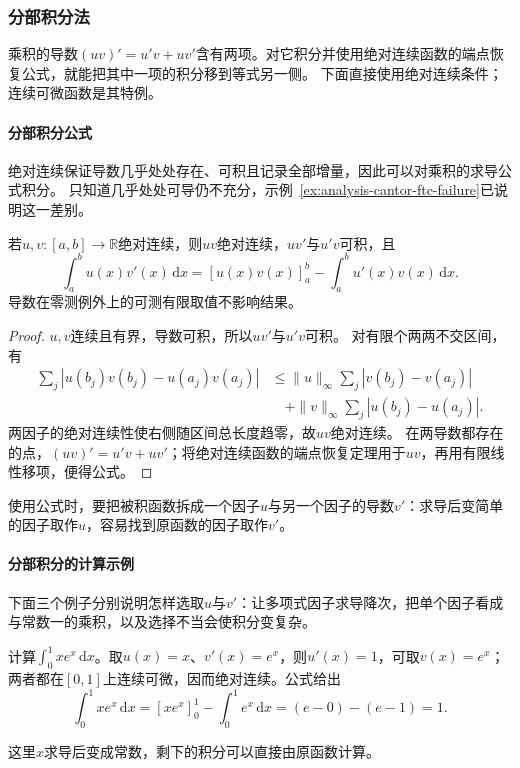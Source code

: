 \subsubsection{分部积分法}
\label{sec:analysis-integration-remainders}

乘积的导数$(uv)'=u'v+uv'$含有两项。对它积分并使用绝对连续函数的端点恢复公式，就能把其中一项的积分移到等式另一侧。
下面直接使用绝对连续条件；连续可微函数是其特例。

\paragraph{分部积分公式}
绝对连续保证导数几乎处处存在、可积且记录全部增量，因此可以对乘积的求导公式积分。
只知道几乎处处可导仍不充分，示例~\ref{ex:analysis-cantor-ftc-failure}已说明这一差别。
\begin{theorem}[勒贝格积分的分部积分公式]
\label{thm:analysis-lebesgue-integration-by-parts}
若$u,v:[a,b]\to\mathbb R$绝对连续，则$uv$绝对连续，$uv'$与$u'v$可积，且
\begin{equation}
 \int_a^bu(x)v'(x)\,\mathrm dx
 =[u(x)v(x)]_a^b-\int_a^bu'(x)v(x)\,\mathrm dx.
\label{eq:analysis-integration-by-parts}
\end{equation}
导数在零测例外上的可测有限取值不影响结果。
\end{theorem}
\begin{proof}
$u,v$连续且有界，导数可积，所以$uv'$与$u'v$可积。
对有限个两两不交区间，有
\[
 \begin{aligned}
 \sum_j|u(b_j)v(b_j)-u(a_j)v(a_j)|
 &\leq\|u\|_\infty\sum_j|v(b_j)-v(a_j)|\\
 &\quad+\|v\|_\infty\sum_j|u(b_j)-u(a_j)|.
 \end{aligned}
\]
两因子的绝对连续性使右侧随区间总长度趋零，故$uv$绝对连续。
在两导数都存在的点，$(uv)'=u'v+uv'$；将绝对连续函数的端点恢复定理用于$uv$，再用有限线性移项，便得公式。
\end{proof}
使用公式时，要把被积函数拆成一个因子$u$与另一个因子的导数$v'$：求导后变简单的因子取作$u$，容易找到原函数的因子取作$v'$。

\paragraph{分部积分的计算示例}
下面三个例子分别说明怎样选取$u$与$v'$：让多项式因子求导降次，把单个因子看成与常数一的乘积，以及选择不当会使积分变复杂。
\begin{example}[多项式乘指数函数的分部积分]
计算$\int_0^1xe^x\,\mathrm dx$。取$u(x)=x$、$v'(x)=e^x$，则$u'(x)=1$，可取$v(x)=e^x$；两者都在$[0,1]$上连续可微，因而绝对连续。公式给出
\[
 \int_0^1xe^x\,\mathrm dx=[xe^x]_0^1-\int_0^1e^x\,\mathrm dx
 =(e-0)-(e-1)=1.
\]
\end{example}
这里$x$求导后变成常数，剩下的积分可以直接由原函数计算。

